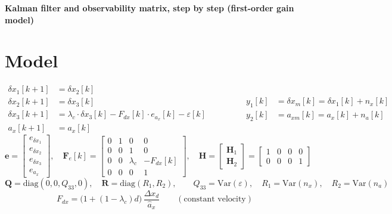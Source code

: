\documentclass[11pt,a4paper]{ctexart}
\newcommand{\lc}{\lambda_c}
\begin{document}
\begin{center}\textbf{\large Kalman filter and observability matrix, step by step (first-order gain model)}\end{center}

\section*{Model}

\[
\begin{aligned}
\delta x_1[k+1] &= \delta x_2[k] \\
\delta x_2[k+1] &= \delta x_3[k] \\
\delta x_3[k+1] &= \lc \cdot \delta x_3[k] - F_{dx}[k]\cdot e_{a_x}[k] - \varepsilon[k] \\
a_x[k+1] &= a_x[k]
\end{aligned}
\qquad\qquad
\begin{aligned}
y_1[k] &= \delta x_m[k] = \delta x_1[k] + n_x[k] \\
y_2[k] &= a_{xm}[k] = a_x[k] + n_a[k]
\end{aligned}
\]
\[
\mathbf{e} = \begin{bmatrix} e_{\delta x_1} \\ e_{\delta x_2} \\ e_{\delta x_3} \\ e_{a_x} \end{bmatrix}, \quad
\mathbf{F}_e[k] =
\begin{bmatrix}
0 & 1 & 0 & 0 \\
0 & 0 & 1 & 0 \\
0 & 0 & \lc & -F_{dx}[k] \\
0 & 0 & 0 & 1
\end{bmatrix}, \quad
\mathbf{H} = \begin{bmatrix} \mathbf{H}_1 \\ \mathbf{H}_2 \end{bmatrix} =
\begin{bmatrix}
1 & 0 & 0 & 0 \\
0 & 0 & 0 & 1
\end{bmatrix}
\]
\[
\mathbf{Q} = \mathrm{diag}(0, 0, Q_{33}, 0), \quad
\mathbf{R} = \mathrm{diag}(R_1, R_2), \qquad
Q_{33} = \mathrm{Var}(\varepsilon), \quad R_1 = \mathrm{Var}(n_x), \quad R_2 = \mathrm{Var}(n_a)
\]
\[
F_{dx} = \big(1 + (1-\lc)d\big)\,\frac{\Delta x_d}{\hat a_x} \qquad (\text{constant velocity})
\]

\end{document}
